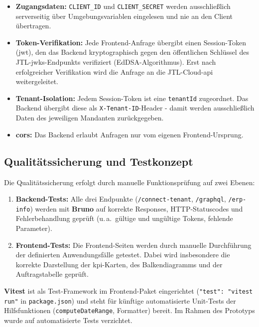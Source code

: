 \documentclass[11pt, a4paper, oneside]{report}
\begin{document}
\begin{itemize}[leftmargin=1.5em]
  \item \textbf{Zugangsdaten:} \texttt{CLIENT\_ID} und \texttt{CLIENT\_SECRET} werden
        ausschließlich serverseitig über Umgebungsvariablen eingelesen und nie an
        den Client übertragen.
  \item \textbf{Token-Verifikation:} Jede Frontend-Anfrage übergibt einen Session-Token
        (\gls{jwt}), den das Backend kryptographisch gegen den öffentlichen Schlüssel des
        JTL-\gls{jwks}-Endpunkts verifiziert (EdDSA-Algorithmus). Erst nach erfolgreicher
        Verifikation wird die Anfrage an die JTL-Cloud-\gls{api} weitergeleitet.
  \item \textbf{Tenant-Isolation:} Jedem Session-Token ist eine \texttt{tenantId} zugeordnet.
        Das Backend übergibt diese als \texttt{X-Tenant-ID}-Header - damit werden
        ausschließlich Daten des jeweiligen Mandanten zurückgegeben.
  \item \textbf{\gls{cors}:} Das Backend erlaubt Anfragen nur vom eigenen Frontend-Ursprung.
\end{itemize}

\subsection*{Qualitätssicherung und Testkonzept}

Die Qualitätssicherung erfolgt durch manuelle Funktionsprüfung auf zwei Ebenen:

\begin{enumerate}[leftmargin=1.5em]
  \item \textbf{Backend-Tests:} Alle drei Endpunkte (\texttt{/connect-tenant},
        \texttt{/graphql}, \texttt{/erp-info}) werden mit \textbf{Bruno} auf korrekte
        Responses, HTTP-Statuscodes und Fehlerbehandlung geprüft (u.\,a.\ gültige und
        ungültige Tokens, fehlende Parameter).
  \item \textbf{Frontend-Tests:} Die Frontend-Seiten werden durch manuelle Durchführung
        der definierten Anwendungsfälle getestet. Dabei wird insbesondere die korrekte
        Darstellung der \gls{kpi}-Karten, des Balkendiagramms und der Auftragstabelle
        geprüft.
\end{enumerate}

\noindent\textbf{Vitest} ist als Test-Framework im Frontend-Paket eingerichtet
(\texttt{"test": "vitest run"} in \texttt{package.json}) und steht für künftige
automatisierte Unit-Tests der Hilfsfunktionen (\texttt{computeDateRange}, Formatter)
bereit. Im Rahmen des Prototyps wurde auf automatisierte Tests verzichtet.
\end{document}
